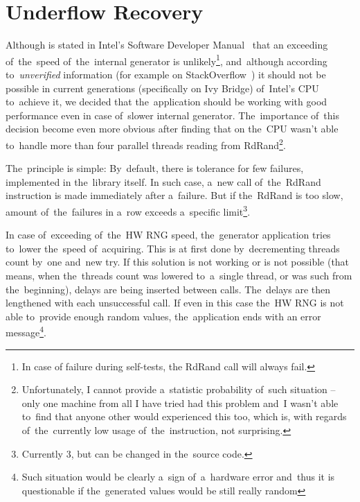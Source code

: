 \section{Underflow Recovery}
\par{
Although is stated in Intel's Software Developer Manual~\cite[chapter~7.3.17]{IntelSWManualVol1} that an exceeding of~the~speed of~the~internal generator is unlikely\footnote{In case of failure during self-tests, the RdRand call will always fail.}, and~although according to~{\em unverified} information (for example on StackOverflow~\cite{StackoverflowRDRANDCharacteristics}) it should not be possible in current generations (specifically on Ivy Bridge) of~Intel's CPU to~achieve it, we decided that the~application should be working with good performance even in case of~slower internal generator. The~importance of~this decision become even more obvious after finding that on  the~CPU wasn't able to~handle more than four parallel threads reading from RdRand\footnote{Unfortunately, I cannot provide a~statistic probability of~such situation -- only one machine from all I have tried had this problem and~I wasn't able to~find that anyone other would experienced this too, which is, with regards of~the~currently low usage of~the~instruction, not surprising.}.
}

\par{
The~principle is simple: By~default, there is tolerance for few failures, implemented in the~library itself. In such case, a~new call of~the~RdRand instruction is made immediately after a~failure. But if the~RdRand is too slow, amount of~the~failures in a~row exceeds a~specific limit\footnote{Currently 3, but can be changed in the~source code.}. 
}

\par{
In case of~exceeding of~the~HW RNG speed, the~generator application tries to~lower the~speed of~acquiring. This is at first done by~decrementing threads count by~one and~new try. If this solution is not working or is not possible (that means, when the~threads count was lowered to~a~single thread, or was such from the~beginning), delays are being inserted between calls. The~delays are then lengthened with each unsuccessful call. If even in this case the~HW RNG is not able to~provide enough random values, the~application ends with an error message\footnote{Such situation would be clearly a~sign of~a~hardware error and~thus it is questionable if the~generated values would be still really random}.
}
